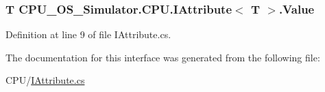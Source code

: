 \subsubsection[{Value}]{\setlength{\rightskip}{0pt plus 5cm}T {\bf C\+P\+U\+\_\+\+O\+S\+\_\+\+Simulator.\+C\+P\+U.\+I\+Attribute}$<$ T $>$.Value\hspace{0.3cm}{\ttfamily [get]}}\label{interface_c_p_u___o_s___simulator_1_1_c_p_u_1_1_i_attribute_a7c1cc8ee7f3ce5334f7a4ace4a9db633}


Definition at line 9 of file I\+Attribute.\+cs.



The documentation for this interface was generated from the following file\+:\begin{DoxyCompactItemize}
\item 
C\+P\+U/\hyperlink{_i_attribute_8cs}{I\+Attribute.\+cs}\end{DoxyCompactItemize}
